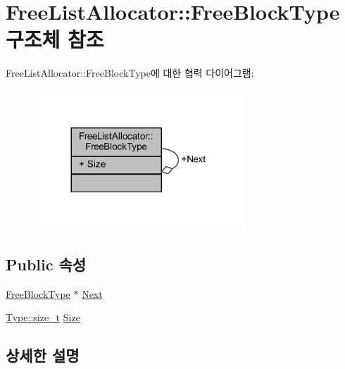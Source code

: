 \hypertarget{struct_comet_engine_1_1_core_1_1_memory_1_1_free_list_allocator_1_1_free_block_type}{}\section{Free\+List\+Allocator\+:\+:Free\+Block\+Type 구조체 참조}
\label{struct_comet_engine_1_1_core_1_1_memory_1_1_free_list_allocator_1_1_free_block_type}


Free\+List\+Allocator\+:\+:Free\+Block\+Type에 대한 협력 다이어그램\+:\nopagebreak
\begin{figure}[H]
\begin{center}
\leavevmode
\includegraphics[width=224pt]{struct_comet_engine_1_1_core_1_1_memory_1_1_free_list_allocator_1_1_free_block_type__coll__graph}
\end{center}
\end{figure}
\subsection*{Public 속성}
\begin{DoxyCompactItemize}
\item 
\hyperlink{struct_comet_engine_1_1_core_1_1_memory_1_1_free_list_allocator_1_1_free_block_type}{Free\+Block\+Type} $\ast$ \hyperlink{struct_comet_engine_1_1_core_1_1_memory_1_1_free_list_allocator_1_1_free_block_type_a85617a85510a3465dbae6a061308aef7}{Next}
\item 
\hyperlink{namespace_comet_engine_1_1_type_a7c94ea6f8948649f8d181ae55911eeaf}{Type\+::size\+\_\+t} \hyperlink{struct_comet_engine_1_1_core_1_1_memory_1_1_free_list_allocator_1_1_free_block_type_ae6cf85bdf7b52a990d4428449e599c8e}{Size}
\end{DoxyCompactItemize}


\subsection{상세한 설명}


